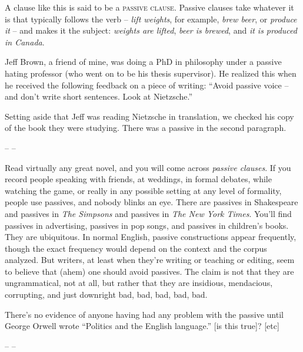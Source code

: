            A clause like this is said to be a \textsc{passive clause}. Passive clauses take whatever it is that typically follows the verb -- \textit{lift weights}, for example, \textit{brew beer}, or \textit{produce it} -- and makes it the subject: \textit{weights are lifted}, \textit{beer is brewed}, and \textit{it is produced in Canada}. 
            
            Jeff Brown, a friend of mine, was doing a PhD in philosophy under a passive hating professor (who went on to be his thesis supervisor). He realized this when he received the following feedback on a piece of writing: ``Avoid passive voice -- and don't write short sentences. Look at Nietzsche.''

            Setting aside that Jeff was reading Nietzsche in translation, we checked his copy of the book they were studying. There was a passive in the second paragraph.

            \begin{center}
                -- --
            \end{center}
            
            Read virtually any great novel, and you will come across \textit{passive clauses}. If you record people speaking with friends, at weddings, in formal debates, while watching the game, or really in any possible setting at any level of formality, people use passives, and nobody blinks an eye. There are passives in Shakespeare and passives in \textit{The Simpsons} and passives in \textit{The New York Times}. You'll find passives in advertising, passives in pop songs, and passives in children's books. They are ubiquitous. In normal English, passive constructions appear frequently, though the exact frequency would depend on the context and the corpus analyzed. But writers, at least when they're writing or teaching or editing, seem to believe that 
             (ahem) one should avoid passives. The claim is not that they are ungrammatical, not at all, but rather that they are insidious, mendacious, corrupting, and just downright bad, bad, bad, bad, bad.

            There's no evidence of anyone having had any problem with the passive until George Orwell wrote ``Politics and the English language.'' [is this true]? [etc]

            \begin{center}
                -- --
            \end{center}
            
